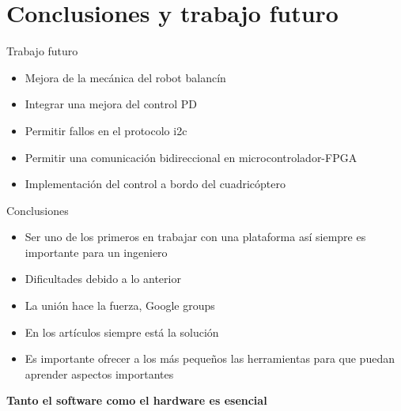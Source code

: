 \documentclass{beamer}
\begin{document}
\section{Conclusiones y trabajo futuro}
\begin{frame}{Trabajo futuro}
\begin{block}{}
	\begin{itemize}
		\item Mejora de la mecánica del robot balancín \pause
		\item Integrar una mejora del control PD \pause
		\item Permitir fallos en el protocolo i2c \pause
		\item Permitir una comunicación bidireccional en microcontrolador-FPGA \pause
		\item Implementación del control a bordo del cuadricóptero 
	\end{itemize}
\end{block}
\end{frame}
\begin{frame}{Conclusiones}
\begin{block}{}
	\begin{itemize}
		\item Ser uno de los primeros en trabajar con una plataforma así siempre es importante para un ingeniero \pause
		\item Dificultades debido a lo anterior \pause
		\item La unión hace la fuerza, Google groups \pause
		\item En los artículos siempre está la solución  \pause
		\item Es importante ofrecer a los más pequeños las herramientas para que puedan aprender aspectos importantes \pause
	\end{itemize}
\end{block}
\begin{alertblock}{}
	\centering \textbf{Tanto el software como el hardware es esencial}
\end{alertblock}
\end{frame}
\end{document}
